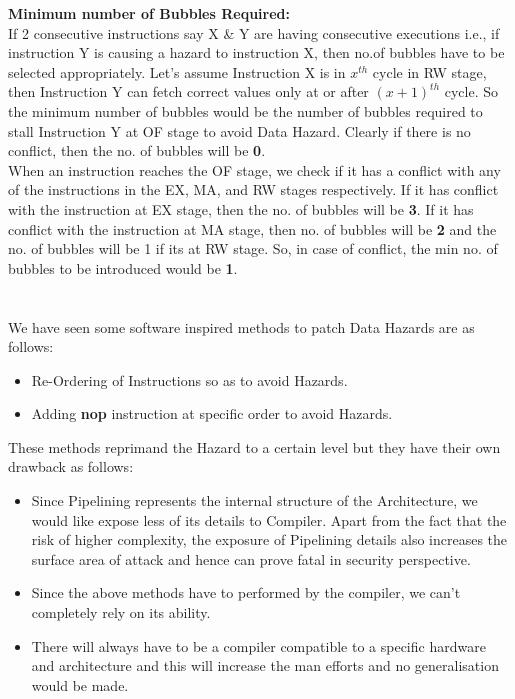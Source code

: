 \documentclass[12pt]{article}
\begin{document}
\textbf{Minimum number of Bubbles Required:} \\
    If 2 consecutive instructions say X \& Y are having consecutive executions i.e., if instruction Y is causing a hazard to instruction X, then no.of bubbles have to be selected appropriately. Let's assume Instruction X is in $x^{th}$ cycle in RW stage, then Instruction Y can fetch correct values only at or after $(x+1)^{th}$ cycle. So the minimum number of bubbles would be the number of bubbles required to stall Instruction Y at OF stage to avoid Data Hazard. Clearly if there is no conflict, then the no. of bubbles will be \textbf{0}. \\
    
    When an instruction reaches the OF stage, we check if it has a conflict with any of the instructions in the EX, MA, and RW stages respectively. If it has conflict with the instruction at EX stage, then the no. of bubbles will be \textbf{3}. If it has conflict with the instruction at MA stage, then no. of bubbles will be \textbf{2} and the no. of bubbles will be 1 if its at RW stage. So, in case of conflict, the min no. of bubbles to be introduced would be \textbf{1}.

\section{}
We have seen some software inspired methods to patch Data Hazards are as follows:
\begin{itemize}
    \item Re-Ordering of Instructions so as to avoid Hazards.
    \item Adding \textbf{nop} instruction at specific order to avoid Hazards.
\end{itemize}
These methods reprimand the Hazard to a certain level but they have their own drawback as follows:
\begin{itemize}
    \item Since Pipelining represents the internal structure of the Architecture, we would like expose less of its details to Compiler. Apart from the fact that the risk of higher complexity, the exposure of Pipelining details also increases the surface area of attack and hence can prove fatal in security perspective.
    \item Since the above methods have to performed by the compiler, we can't completely rely on its ability.
    \item There will always have to be a compiler compatible to a specific hardware and architecture and this will increase the man efforts and no generalisation would be made.
\end{itemize}
\end{document}
